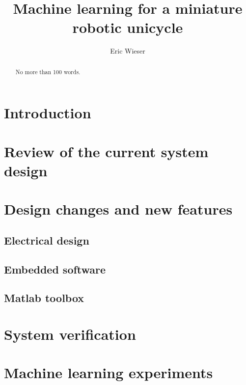 \documentclass[12pt,a4paper]{IIBproject}
\begin{document}


	\author{Eric Wieser}
	\title{Machine learning for a miniature robotic unicycle}
	\maketitle
	\thispagestyle{empty}



	\begin{abstract}
	No more than 100 words.
	\end{abstract}
	\pagestyle{plain}
	\tableofcontents
	\newpage

	\chapter{Introduction}
	

	\chapter{Review of the current system design}
	

	\chapter{Design changes and new features}

		\section{Electrical design}
		

		\section{Embedded software}
		

		\section{Matlab toolbox}
		

	\chapter{System verification}
	

	\chapter{Machine learning experiments}
\end{document}
